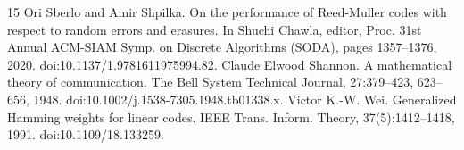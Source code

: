 \begin{thebibliography}{15}
 Ori Sberlo and Amir Shpilka. On the performance of Reed-Muller codes with respect to random errors and erasures. In Shuchi Chawla, editor, Proc. 31st Annual ACM-SIAM Symp. on Discrete Algorithms (SODA), pages 1357–1376, 2020. doi:10.1137/1.9781611975994.82.
 Claude Elwood Shannon. A mathematical theory of communication. The Bell System Technical Journal, 27:379–423, 623–656, 1948. doi:10.1002/j.1538-7305.1948.tb01338.x.
 Victor K.-W. Wei. Generalized Hamming weights for linear codes. IEEE Trans. Inform. Theory, 37(5):1412–1418, 1991. doi:10.1109/18.133259.
\end{thebibliography}
